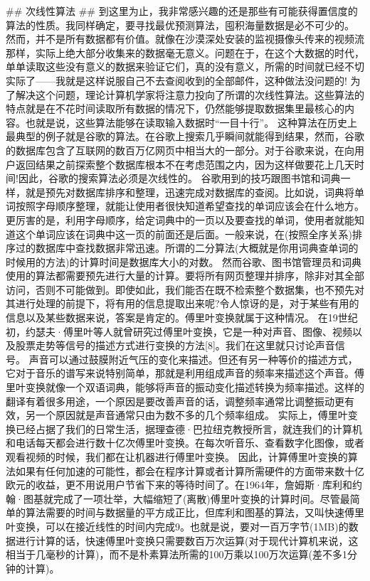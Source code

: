 ## 次线性算法 ## 
到这里为止，我非常感兴趣的还是那些有可能获得置信度的算法的性质。我同样确定，要寻找最优预测算法，囤积海量数据是必不可少的。
然而，并不是所有数据都有价值。就像在沙漠深处安装的监视摄像头传来的视频流那样，实际上绝大部分收集来的数据毫无意义。问题在于，在这个大数据的时代，单单读取这些没有意义的数据来验证它们，真的没有意义，所需的时间就已经不切实际了——我就是这样说服自己不去查阅收到的全部邮件，这种做法没问题的!
为了解决这个问题，理论计算机学家将注意力投向了所谓的次线性算法。这些算法的特点就是在不花时间读取所有数据的情况下，仍然能够提取数据集里最核心的内容。也就是说，这些算法能够在读取输入数据时“一目十行”。
这种算法在历史上最典型的例子就是谷歌的算法。在谷歌上搜索几乎瞬间就能得到结果，然而，谷歌的数据库包含了互联网的数百万亿网页中相当大的一部分。对于谷歌来说，在向用户返回结果之前探索整个数据库根本不在考虑范围之内，因为这样做要花上几天时间!因此，谷歌的搜索算法必须是次线性的。
谷歌用到的技巧跟图书馆和词典一样，就是预先对数据库排序和整理，迅速完成对数据库的查阅。比如说，词典将单词按照字母顺序整理，就能让使用者很快知道希望查找的单词应该会在什么地方。更厉害的是，利用字母顺序，给定词典中的一页以及要查找的单词，使用者就能知道这个单词应该在词典中这一页的前面还是后面。一般来说，在(按照全序关系)排序过的数据库中查找数据非常迅速。所谓的二分算法(大概就是你用词典查单词的时候用的方法)的计算时间是数据库大小的对数。
然而谷歌、图书馆管理员和词典使用的算法都需要预先进行大量的计算。要将所有网页整理并排序，除非对其全部访问，否则不可能做到。即使如此，我们能否在既不检索整个数据集，也不预先对其进行处理的前提下，将有用的信息提取出来呢?令人惊讶的是，对于某些有用的信息以及某些数据来说，答案是肯定的。傅里叶变换就属于这种情况。
在19世纪初，约瑟夫·傅里叶等人就曾研究过傅里叶变换，它是一种对声音、图像、视频以及股票走势等信号的描述方式进行变换的方法[8]。我们在这里就只讨论声音信号。
声音可以通过鼓膜附近气压的变化来描述。但还有另一种等价的描述方式，它对于音乐的谱写来说特别简单，那就是利用组成声音的频率来描述这个声音。傅里叶变换就像一个双语词典，能够将声音的振动变化描述转换为频率描述。这样的翻译有着很多用途，一个原因是要改善声音的话，调整频率通常比调整振动更有效，另一个原因就是声音通常只由为数不多的几个频率组成。
实际上，傅里叶变换已经占据了我们的日常生活，据理查德·巴拉纽克教授所言，就连我们的计算机和电话每天都会进行数十亿次傅里叶变换。在每次听音乐、查看数字化图像，或者观看视频的时候，我们都在让机器进行傅里叶变换。
因此，计算傅里叶变换的算法如果有任何加速的可能性，都会在程序计算或者计算所需硬件的方面带来数十亿欧元的收益，更不用说用户节省下来的等待时间了。在1964年，詹姆斯·库利和约翰·图基就完成了一项壮举，大幅缩短了(离散)傅里叶变换的计算时间。尽管最简单的算法需要的时间与数据量的平方成正比，但库利和图基的算法，又叫快速傅里叶变换，可以在接近线性的时间内完成9。也就是说，要对一百万字节(1MB)的数据进行计算的话，快速傅里叶变换只需要数百万次运算(对于现代计算机来说，这相当于几毫秒的计算)，而不是朴素算法所需的100万乘以100万次运算(差不多1分钟的计算)。
